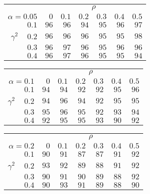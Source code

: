 \begin{tabular}{r|rrrrrr}
\hline\hline
 &\multicolumn{6}{c}{$\rho$} \\ 
 $\alpha = 0.05$ & $0$ & $0.1$ & $0.2$ & $0.3$ & $0.4$ & $0.5$ \\ 
 \hline$0.1$ & $96$ & $96$ & $94$ & $95$ & $96$ & $97$\\ 
$\gamma^2\;\;\;$ $0.2$ & $96$ & $96$ & $96$ & $95$ & $95$ & $98$\\ 
$0.3$ & $96$ & $97$ & $96$ & $95$ & $96$ & $96$\\ 
$0.4$ & $96$ & $97$ & $96$ & $95$ & $95$ & $94$\\ 
 \hline 
 \end{tabular}
 
 \vspace{2em} 
 
\begin{tabular}{r|rrrrrr}
\hline\hline
 &\multicolumn{6}{c}{$\rho$} \\ 
 $\alpha = 0.1$ & $0$ & $0.1$ & $0.2$ & $0.3$ & $0.4$ & $0.5$ \\ 
 \hline$0.1$ & $94$ & $94$ & $92$ & $92$ & $95$ & $96$\\ 
$\gamma^2\;\;\;$ $0.2$ & $94$ & $96$ & $94$ & $92$ & $95$ & $95$\\ 
$0.3$ & $95$ & $96$ & $95$ & $92$ & $93$ & $94$\\ 
$0.4$ & $92$ & $95$ & $95$ & $93$ & $90$ & $92$\\ 
 \hline 
 \end{tabular}
 
 \vspace{2em} 
 
\begin{tabular}{r|rrrrrr}
\hline\hline
 &\multicolumn{6}{c}{$\rho$} \\ 
 $\alpha = 0.2$ & $0$ & $0.1$ & $0.2$ & $0.3$ & $0.4$ & $0.5$ \\ 
 \hline$0.1$ & $90$ & $91$ & $87$ & $87$ & $91$ & $92$\\ 
$\gamma^2\;\;\;$ $0.2$ & $93$ & $92$ & $89$ & $88$ & $91$ & $92$\\ 
$0.3$ & $90$ & $91$ & $90$ & $89$ & $88$ & $92$\\ 
$0.4$ & $90$ & $93$ & $91$ & $89$ & $88$ & $90$\\ 
 \hline 
 \end{tabular}